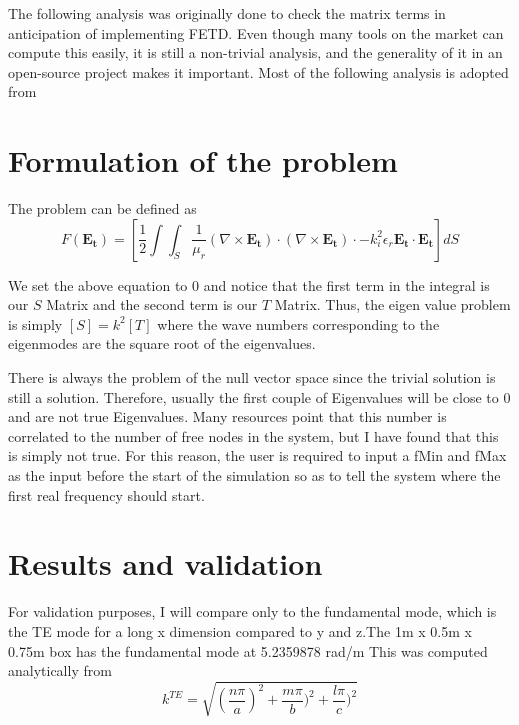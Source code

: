 \documentclass[11pt,a4paper,oldfontcommands]{memoir}
\begin{document}
The following analysis was originally done to check the matrix terms in anticipation of implementing FETD. Even though many tools on the market can compute this easily, it is still a non-trivial analysis, and the generality of it in an open-source project makes it important. Most of the following analysis is adopted from ~\cite{Davidson}

\section{Formulation of the problem}

The problem can be defined as 
\begin{equation} \label{eq:11}
F(\mathbf{E_t}) = [\frac{1}{2} \int\int_{S} \frac{1}{\mu_r} (\nabla \times \mathbf{E_t}) \cdot (\nabla \times \mathbf{E_t}) \cdot  - k_i^2 \epsilon_r \mathbf{E_t}\cdot\mathbf{E_t}] dS
\end{equation}

We set the above equation to 0 and notice that the first term in the integral is our $S$ Matrix and the second term is our $T$ Matrix. Thus, the eigen value problem is simply $[S] = k^2[T]$ where the wave numbers corresponding to the eigenmodes are the square root of the eigenvalues.

There is always the problem of the null vector space since the trivial solution is still a solution. Therefore, usually the first couple of Eigenvalues will be close to 0 and are not true Eigenvalues. Many resources point that this number is correlated to the number of free nodes in the system, but I have found that this is simply not true. For this reason, the user is required to input a fMin and fMax as the input before the start of the simulation so as to tell the system where the first real frequency should start.

\section{Results and validation}

For validation purposes, I will compare only to the fundamental mode, which is the TE mode for a long x dimension compared to y and z.The 1m x 0.5m x 0.75m box has the fundamental mode at 5.2359878 rad/m  
This was computed analytically from
\begin{equation} \label{eq:11}
k^{TE} = \sqrt{(\frac{n\pi}{a})^2 + \frac{m\pi}{b})^2 + \frac{l\pi}{c})^2}
\end{equation}
\end{document}

